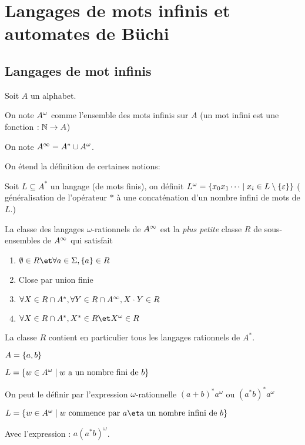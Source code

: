 \section{Langages de mots infinis et automates de Büchi}

\subsection{Langages de mot infinis}

\begin{notation}
	Soit $A$ un alphabet.

	On note $A^{\omega}$ comme l'ensemble des mots infinis sur $A$
	(un mot infini est une fonction $: \mathbb{N} \to A$)

	On note $A^{\infty} = A^* \cup A^{\omega}$.

	On étend la définition de certaines notions:

	Soit $L \subseteq A^*$ un langage (de mots finis), on définit
	$L^{\omega} = \left\{x_0x_1\cdots \mid x_i \in L \setminus \left\{\varepsilon\right\}\right\}$
	( généralisation de l'opérateur $*$ à une concaténation d'un nombre infini de mots de $L$.)
\end{notation}


\begin{definition}
	La classe des langages $\omega$-rationnels de $A^{\infty}$ est la \emph{plus petite}
	classe $R$ de sous-ensembles de $A^{\infty}$ qui satisfait
	\begin{enumerate}
		\item $\emptyset \in R \et \forall a \in \Sigma, \set a \in R$
		\item Close par union finie
		\item $\forall X \in R \cap A^*, \forall Y \in R \cap A^{\infty}, X \cdot Y \in R$ \label{omega-clot-fi}
		\item $\forall X \in R \cap A^*, X^* \in R \et X^{\omega} \in R$\label{omega-clot-op}
	\end{enumerate}
\end{definition}

\begin{remarque}
	La classe $R$ contient en particulier tous les langages rationnels de $A^*$.
\end{remarque}

\begin{exemple}
	$A = \left\{a,b\right\}$

	$L = \left\{w \in A^{\omega} \mid w \text{ a un nombre fini de } b\right\}$

	On peut le définir par l'expression $\omega$-rationnelle $(a + b)^* a^{\omega}$ ou $(a^*b)^* a^{\omega}$


	$L = \setdef {w \in \aomega} {w \text{ commence par } a \et \text{a un nombre infini de } b}$

	Avec l'expression : $a(a^*b)^{\omega}$.
\end{exemple}

